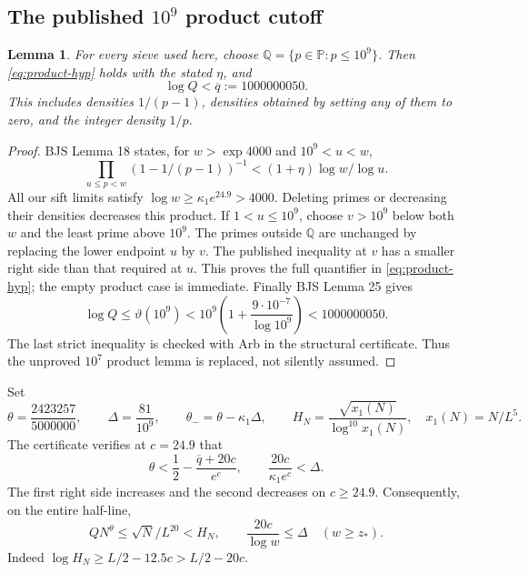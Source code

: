 \documentclass[11pt]{article}
\newtheorem{lemma}[theorem]{Lemma}
\theoremstyle{definition}
\begin{document}
\subsection{The published \texorpdfstring{$10^9$}{1,000,000,000} product cutoff}

\begin{lemma}\label{lem:product}
For every sieve used here, choose $\mathbb Q=\{p\in\mathbb P:p\le10^9\}$.
Then \eqref{eq:product-hyp} holds with the stated $\eta$, and
\begin{equation}\label{eq:Qbound}
 \log Q<\overline q:=1000000050.
\end{equation}
This includes densities $1/(p-1)$, densities obtained by setting any of
them to zero, and the integer density $1/p$.
\end{lemma}
\begin{proof}
BJS Lemma 18 states, for $w>\exp4000$ and $10^9<u<w$,
\[
 \prod_{u\le p<w}(1-1/(p-1))^{-1}
 <(1+\eta)\log w/\log u.
\]
All our sift limits satisfy $\log w\ge\kappa_1e^{24.9}>4000$.
Deleting primes or decreasing their densities decreases this product.
If $1<u\le10^9$, choose $v>10^9$ below both $w$ and the least prime
above $10^9$.  The primes outside $\mathbb Q$ are unchanged by replacing
the lower endpoint $u$ by $v$.  The published inequality at $v$ has a
smaller right side than that required at $u$.  This proves the full
quantifier in \eqref{eq:product-hyp}; the empty product case is immediate.
Finally BJS Lemma 25 gives
\[
 \log Q\le\vartheta(10^9)
 <10^9\left(1+\frac{9\cdot10^{-7}}{\log10^9}\right)
 <1000000050.
\]
The last strict inequality is checked with Arb in the structural
certificate.  Thus the unproved $10^7$ product lemma is replaced, not
silently assumed.
\end{proof}

Set
\begin{equation}\label{eq:levels}
 \theta=\frac{2423257}{5000000},\qquad
 \Delta=\frac{81}{10^9},\qquad \theta_- =\theta-\kappa_1\Delta,
 \qquad H_N=\frac{\sqrt{x_1(N)}}{\log^{10}x_1(N)},
 \quad x_1(N)=N/L^5.
\end{equation}
The certificate verifies at $c=24.9$ that
\[
 \theta<\frac12-\frac{\overline q+20c}{e^c},\qquad
 \frac{20c}{\kappa_1e^c}<\Delta.
\]
The first right side increases and the second decreases on $c\ge24.9$.
Consequently, on the entire half-line,
\begin{equation}\label{eq:level-support}
 QN^\theta\le \sqrt N/L^{20}<H_N,
 \qquad \frac{20c}{\log w}\le\Delta\quad(w\ge z_*).
\end{equation}
Indeed $\log H_N\ge L/2-12.5c>L/2-20c$.
\end{document}
